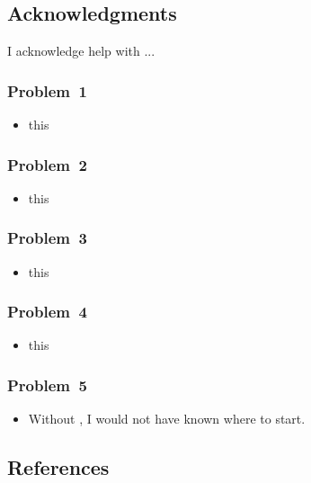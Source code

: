 
\newpage\clearpage
\subsection*{Acknowledgments}

I acknowledge help with ...

\subsubsection*{Problem~1}
\begin{itemize}
\item this
\end{itemize}

\subsubsection*{Problem~2}
\begin{itemize}
\item this
\end{itemize}

\subsubsection*{Problem~3}
\begin{itemize}
\item this
\end{itemize}

\subsubsection*{Problem~4}
\begin{itemize}
\item this
\end{itemize}

\subsubsection*{Problem~5}
\begin{itemize}
\item Without \cite{j23:2013}, I would not have known where to start.
\end{itemize}

\subsection*{References}
\printbibliography
